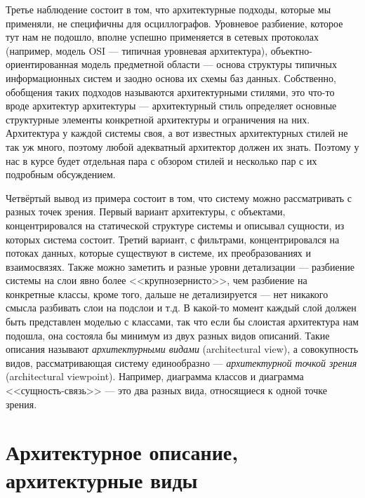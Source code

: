 \documentclass[a5paper]{article}
\begin{document}
Третье наблюдение состоит в том, что архитектурные подходы, которые мы применяли, не специфичны для осциллографов. Уровневое разбиение, которое тут нам не подошло, вполне успешно применяется в сетевых протоколах (например, модель OSI --- типичная уровневая архитектура), объектно-ориентированная модель предметной области --- основа структуры типичных информационных систем и заодно основа их схемы баз данных. Собственно, обобщения таких подходов называются архитектурными стилями, это что-то вроде архитектур архитектуры --- архитектурный стиль определяет основные структурные элементы конкретной архитектуры и ограничения на них. Архитектура у каждой системы своя, а вот известных архитектурных стилей не так уж много, поэтому любой адекватный архитектор должен их знать. Поэтому у нас в курсе будет отдельная пара с обзором стилей и несколько пар с их подробным обсуждением.

Четвёртый вывод из примера состоит в том, что систему можно рассматривать с разных точек зрения. Первый вариант архитектуры, с объектами, концентрировался на статической структуре системы и описывал сущности, из которых система состоит. Третий вариант, с фильтрами, концентрировался на потоках данных, которые существуют в системе, их преобразованиях и взаимосвязях. Также можно заметить и разные уровни детализации --- разбиение системы на слои явно более <<крупнозернисто>>, чем разбиение на конкретные классы, кроме того, дальше не детализируется --- нет никакого смысла разбивать слои на подслои и т.д. В какой-то момент каждый слой должен быть представлен моделью с классами, так что если бы слоистая архитектура нам подошла, она состояла бы минимум из двух разных видов описаний. Такие описания называют \emph{архитектурными видами} (architectural view), а совокупность видов, рассматривающая систему единообразно --- \emph{архитектурной точкой зрения} (architectural viewpoint). Например, диаграмма классов и диаграмма <<сущность-связь>> --- это два разных вида, относящиеся к одной точке зрения.

\section{Архитектурное описание, архитектурные виды}
\end{document}
